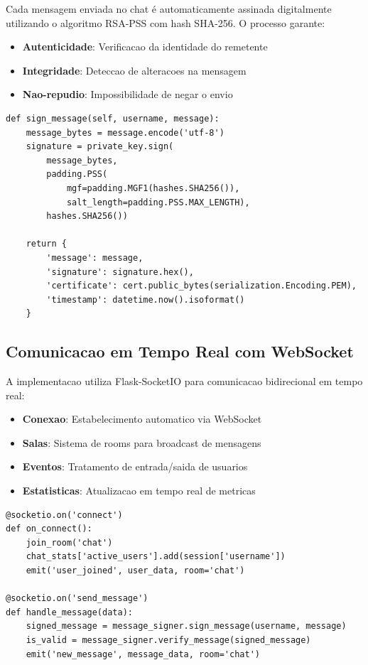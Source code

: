 \documentclass[12pt,a4paper,oneside]{article}
\begin{document}
Cada mensagem enviada no chat é automaticamente assinada digitalmente utilizando o algoritmo RSA-PSS com hash SHA-256. O processo garante:

\begin{itemize}
    \item \textbf{Autenticidade}: Verificacao da identidade do remetente
    \item \textbf{Integridade}: Deteccao de alteracoes na mensagem
    \item \textbf{Nao-repudio}: Impossibilidade de negar o envio
\end{itemize}

\begin{lstlisting}[caption=Assinatura de mensagem]
def sign_message(self, username, message):
    message_bytes = message.encode('utf-8')
    signature = private_key.sign(
        message_bytes,
        padding.PSS(
            mgf=padding.MGF1(hashes.SHA256()),
            salt_length=padding.PSS.MAX_LENGTH),
        hashes.SHA256())
    
    return {
        'message': message,
        'signature': signature.hex(),
        'certificate': cert.public_bytes(serialization.Encoding.PEM),
        'timestamp': datetime.now().isoformat()
    }
\end{lstlisting}

\subsection{Comunicacao em Tempo Real com WebSocket}

A implementacao utiliza Flask-SocketIO para comunicacao bidirecional em tempo real:

\begin{itemize}
    \item \textbf{Conexao}: Estabelecimento automatico via WebSocket
    \item \textbf{Salas}: Sistema de rooms para broadcast de mensagens
    \item \textbf{Eventos}: Tratamento de entrada/saida de usuarios
    \item \textbf{Estatisticas}: Atualizacao em tempo real de metricas
\end{itemize}

\begin{lstlisting}[caption=Eventos WebSocket principais]
@socketio.on('connect')
def on_connect():
    join_room('chat')
    chat_stats['active_users'].add(session['username'])
    emit('user_joined', user_data, room='chat')

@socketio.on('send_message')
def handle_message(data):
    signed_message = message_signer.sign_message(username, message)
    is_valid = message_signer.verify_message(signed_message)
    emit('new_message', message_data, room='chat')
\end{lstlisting}
\end{document}
